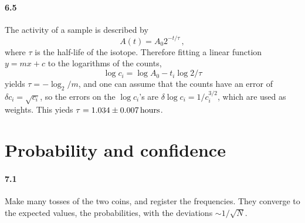 \documentclass[a4paper,12pt]{article}
\begin{document}
\paragraph{6.5} The activity of a sample is described by
\[
 A(t) = A_0 2^{-t/\tau}\,,
\]
where $\tau$ is the half-life of the isotope. Therefore fitting a linear function $ y = m x + c$ to the logarithms of the counts,
\[
 \log c_i = \log A_0 - t_i \log 2 / \tau
\]
yields $\tau = - \log_2 / m$, and one can assume that the counts have an error of $\delta c_i = \sqrt{c_i}$, so the errors on the $\log c_i$'s are $\delta \log c_i = 1/c_i^{3/2}$, which are used as weights. This yieds $\tau = 1.034 \pm 0.007\,{\rm hours }$.



\section{Probability and confidence}

\paragraph{7.1} Make many tosses of the two coins, and register the frequencies. They converge to the expected values, the probabilities, with the deviations $\sim 1/\sqrt{N}$.
\end{document}
